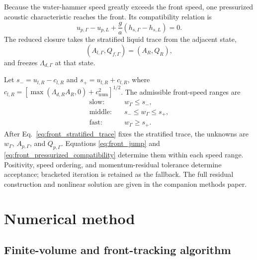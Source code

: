 Because the water-hammer speed greatly exceeds the front speed, one
pressurized acoustic characteristic reaches the front. Its compatibility
relation is
\begin{equation}
u_{p,\Gamma}-u_{p,L}
+\frac{g}{a}\left(h_{s,\Gamma}-h_{s,L}\right)=0.
\label{eq:front_pressurized_compatibility}
\end{equation}
The reduced closure takes the stratified liquid trace from the adjacent state,
\begin{equation}
\left(A_{l,\Gamma},Q_{f,\Gamma}\right)=\left(A_R,Q_R\right),
\label{eq:front_stratified_trace}
\end{equation}
and freezes $\Lambda_{d,\Gamma}$ at that state.

Let $s_-=u_{l,R}-c_{l,R}$ and $s_+=u_{l,R}+c_{l,R}$, where
$c_{l,R}=[\max(\Lambda_{d,R}A_R,0)+c_{\mathrm{num}}^2]^{1/2}$. The admissible
front-speed ranges are
\begin{equation}
\begin{aligned}
\text{slow:}\quad   & w_\Gamma\le s_-,\\
\text{middle:}\quad & s_-\le w_\Gamma\le s_+,\\
\text{fast:}\quad   & w_\Gamma\ge s_+.
\end{aligned}
\label{eq:front_speed_ranges}
\end{equation}
After Eq.~\eqref{eq:front_stratified_trace} fixes the stratified trace, the
unknowns are $w_\Gamma$, $A_{p,\Gamma}$, and $Q_{p,\Gamma}$. Equations
\eqref{eq:front_jump} and \eqref{eq:front_pressurized_compatibility} determine
them within each speed range. Positivity, speed ordering, and momentum-residual
tolerance determine acceptance; bracketed iteration is retained as the
fallback. The full residual construction and nonlinear solution are given in
the companion methods paper.

\section{Numerical method}
\label{sec:model:numerics}

\subsection{Finite-volume and front-tracking algorithm}
\label{sec:model:fv}

